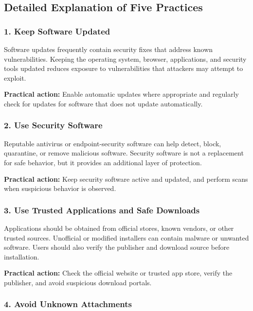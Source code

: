 \documentclass[12pt,a4paper]{article}
\begin{document}
\subsection{Detailed Explanation of Five Practices}

\subsubsection{1. Keep Software Updated}

Software updates frequently contain security fixes that address known
vulnerabilities. Keeping the operating system, browser, applications,
and security tools updated reduces exposure to vulnerabilities that
attackers may attempt to exploit.

\textbf{Practical action:} Enable automatic updates where appropriate
and regularly check for updates for software that does not update
automatically.

\subsubsection{2. Use Security Software}

Reputable antivirus or endpoint-security software can help detect,
block, quarantine, or remove malicious software. Security software is
not a replacement for safe behavior, but it provides an additional
layer of protection.

\textbf{Practical action:} Keep security software active and updated,
and perform scans when suspicious behavior is observed.

\subsubsection{3. Use Trusted Applications and Safe Downloads}

Applications should be obtained from official stores, known vendors,
or other trusted sources. Unofficial or modified installers can contain
malware or unwanted software. Users should also verify the publisher
and download source before installation.

\textbf{Practical action:} Check the official website or trusted app
store, verify the publisher, and avoid suspicious download portals.

\subsubsection{4. Avoid Unknown Attachments}
\end{document}
